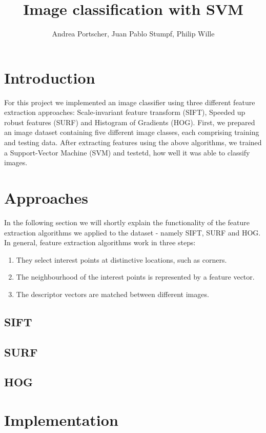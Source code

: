 \documentclass{scrartcl}
\title{Image classification with SVM}
\author{Andrea Portscher, Juan Pablo Stumpf, Philip Wille}
\begin{document}
\maketitle

\section{Introduction}
For this project we implemented an image classifier using three different feature extraction approaches: Scale-invariant feature transform (SIFT), Speeded up robust features (SURF) and Histogram of Gradients (HOG). First, we prepared an image dataset containing five different image classes, each comprising training and testing data. After extracting features using the above algorithms, we trained a Support-Vector Machine (SVM) and testetd, how well it was able to classify images.
\section{Approaches}
In the following section we will shortly explain the functionality of the feature extraction algorithms we applied to the dataset - namely SIFT, SURF and HOG.
In general, feature extraction algorithms work in three steps\cite{bay2006}:
\begin{enumerate}
  \item They select interest points at distinctive locations, such as corners.
  \item The neighbourhood of the interest points is represented by a feature vector.
  \item The descriptor vectors are matched between different images.
\end{enumerate}

\subsection{SIFT}
\subsection{SURF}



\subsection{HOG}
\section{Implementation}
\end{document}
